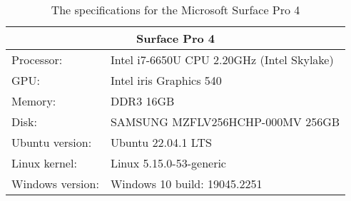 \begin{table}[H]
    \begin{tabular}{ll}
    \hline
    \multicolumn{2}{|c|}{Surface Pro 4}           \\ \hline
    Processor: & Intel i7-6650U CPU 2.20GHz (Intel Skylake) \\
    GPU:       & Intel iris Graphics 540          \\
    Memory:    & DDR3 16GB                         \\
    Disk:      & SAMSUNG MZFLV256HCHP-000MV 256GB   \\
    Ubuntu version:  & Ubuntu 22.04.1 LTS                   \\
    Linux kernel: & Linux 5.15.0-53-generic      \\
    Windows version:& Windows 10 build: 19045.2251
    \end{tabular}
    \caption{The specifications for the Microsoft Surface Pro 4}
    \label{tab:surfacePro}
\end{table} 